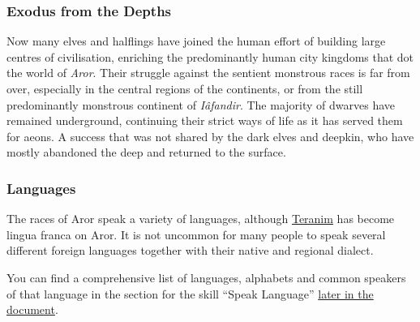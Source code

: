 \subsubsection{Exodus from the Depths}
\label{sec:Exodus from the Depths}

Now many elves and halflings have joined the human effort of building large
centres of civilisation, enriching the predominantly human city kingdoms that
dot the world of \emph{Aror}. Their struggle against the sentient monstrous
races is far from over, especially in the central regions of the continents,
or from the still predominantly monstrous continent of \emph{Iâfandir}. The
majority of dwarves have remained underground, continuing their strict ways of
life as it has served them for aeons. A success that was not shared by the
dark elves and deepkin, who have mostly abandoned the deep and returned to the
surface.

\subsubsection{Languages}
\label{sec:Languages}

The races of Aror speak a variety of languages, although \hyperref[sec:Speak
Language]{Teranim} has become lingua franca on Aror. It is not uncommon for
many people to speak several different foreign languages together with their
native and regional dialect.

\begin{note}
  You can find a comprehensive list of languages, alphabets and common speakers
  of that language in the section for the skill ``Speak
  Language'' \hyperref[sec:Speak Language]{later in the document}.
\end{note}



















